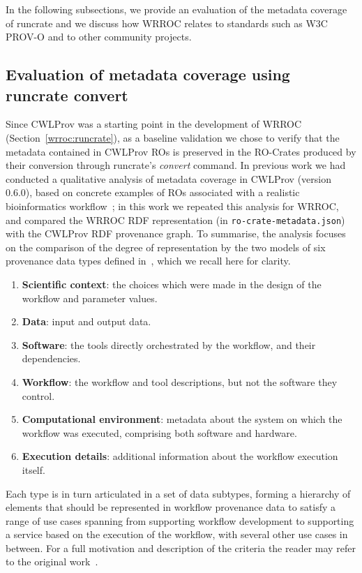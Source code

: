 In the following subsections, we provide an evaluation of the metadata coverage of runcrate and we discuss how WRROC relates to standards such as W3C PROV-O and to other community projects.


\subsection{Evaluation of metadata coverage using runcrate convert}

Since CWLProv was a starting point in the development of WRROC (Section~\ref{wrroc:runcrate}), as a baseline validation we chose to verify that the metadata contained in CWLProv ROs is preserved in the RO-Crates produced by their conversion through runcrate's \emph{convert} command. In previous work we had conducted a qualitative analysis of metadata coverage in CWLProv (version 0.6.0), based on concrete examples of ROs associated with a realistic bioinformatics workflow~\cite{De Wit 2022};
in this work we repeated this analysis for WRROC, and compared the WRROC RDF representation (in \texttt{ro-crate-metadata.json}) with the CWLProv RDF provenance graph.
To summarise, the analysis focuses on the comparison of the degree of representation by the two models of six provenance data
types defined in~\cite{De Wit 2022}, which we recall here for clarity.
\begin{enumerate}[label={\bfseries T\arabic*.}]
  \item {\bf Scientific context}: the choices which were made in the design of the workflow and parameter values.
  \item {\bf Data}: input and output data.
  \item {\bf Software}: the tools directly orchestrated by the workflow, and their dependencies.
  \item {\bf Workflow}: the workflow and tool descriptions, but not the software they control.
  \item {\bf Computational environment}: metadata about the system on which the workflow was executed, comprising both software and hardware.
  \item {\bf Execution details}: additional information about the workflow execution itself.
\end{enumerate}
Each type is in turn articulated in a set of data subtypes, forming a hierarchy
of elements that should be represented in
workflow provenance data to satisfy a range of use cases spanning from
supporting workflow development to supporting a service based on the
execution of the workflow, with several other use cases in between.  For a full
motivation and description of the criteria the reader may refer to the original work~\cite{De Wit 2022}.

